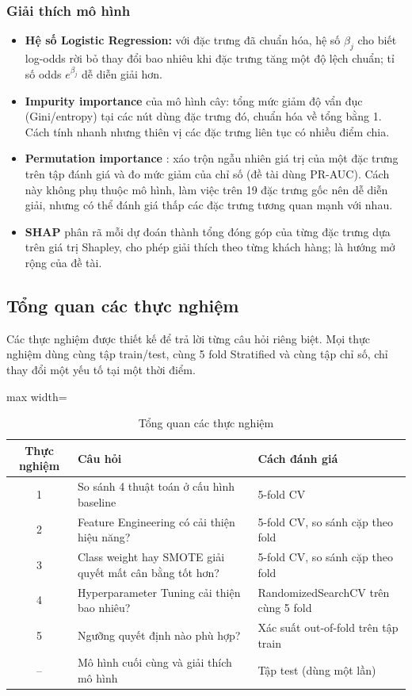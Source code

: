 \subsubsection{Giải thích mô hình}
\begin{itemize}
    \item \textbf{Hệ số Logistic Regression:} với đặc trưng đã chuẩn hóa, hệ số $\beta_j$ cho biết log-odds rời bỏ thay đổi bao nhiêu khi đặc trưng tăng một độ lệch chuẩn; tỉ số odds $e^{\beta_j}$ dễ diễn giải hơn.
    \item \textbf{Impurity importance} của mô hình cây: tổng mức giảm độ vẩn đục (Gini/entropy) tại các nút dùng đặc trưng đó, chuẩn hóa về tổng bằng 1. Cách tính nhanh nhưng thiên vị các đặc trưng liên tục có nhiều điểm chia.
    \item \textbf{Permutation importance} \cite{breiman2001}: xáo trộn ngẫu nhiên giá trị của một đặc trưng trên tập đánh giá và đo mức giảm của chỉ số (đề tài dùng PR-AUC). Cách này không phụ thuộc mô hình, làm việc trên 19 đặc trưng gốc nên dễ diễn giải, nhưng có thể đánh giá thấp các đặc trưng tương quan mạnh với nhau.
    \item \textbf{SHAP} \cite{lundberg2017} phân rã mỗi dự đoán thành tổng đóng góp của từng đặc trưng dựa trên giá trị Shapley, cho phép giải thích theo từng khách hàng; là hướng mở rộng của đề tài.
\end{itemize}

\subsection{Tổng quan các thực nghiệm}

Các thực nghiệm được thiết kế để trả lời từng câu hỏi riêng biệt. Mọi thực nghiệm dùng cùng tập train/test, cùng 5 fold Stratified và cùng tập chỉ số, chỉ thay đổi một yếu tố tại một thời điểm.

\begin{table}[H]
\centering
\begin{adjustbox}{max width=\textwidth}
\begin{tabular}{|c|p{6cm}|p{6.5cm}|}
\hline
\textbf{Thực nghiệm} & \textbf{Câu hỏi} & \textbf{Cách đánh giá} \\
\hline
1 & So sánh 4 thuật toán ở cấu hình baseline & 5-fold CV \\
\hline
2 & Feature Engineering có cải thiện hiệu năng? & 5-fold CV, so sánh cặp theo fold \\
\hline
3 & Class weight hay SMOTE giải quyết mất cân bằng tốt hơn? & 5-fold CV, so sánh cặp theo fold \\
\hline
4 & Hyperparameter Tuning cải thiện bao nhiêu? & RandomizedSearchCV trên cùng 5 fold \\
\hline
5 & Ngưỡng quyết định nào phù hợp? & Xác suất out-of-fold trên tập train \\
\hline
-- & Mô hình cuối cùng và giải thích mô hình & Tập test (dùng một lần) \\
\hline
\end{tabular}
\end{adjustbox}
\caption{Tổng quan các thực nghiệm}
\end{table}

